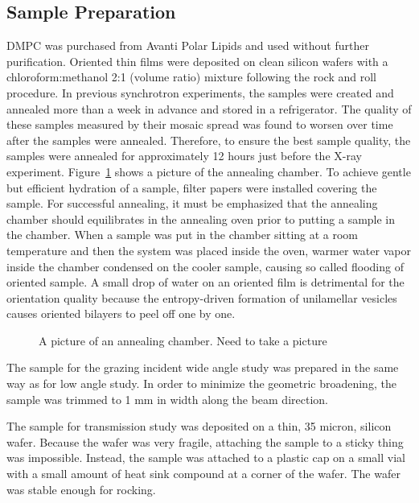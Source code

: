 \subsection{Sample Preparation}
DMPC was purchased from Avanti Polar Lipids and used without further purification.
Oriented thin films were deposited on clean silicon wafers with
a chloroform:methanol 2:1 (volume ratio) mixture following the rock and roll procedure.   
In previous synchrotron experiments, the samples were created and annealed 
more than a week in advance and stored in a refrigerator. The quality of 
these samples measured by their mosaic spread was found to worsen over time
after the samples were annealed. Therefore, to ensure the best sample quality, the 
samples were annealed for approximately 12 hours just before the X-ray experiment.
Figure~\ref{fig:annealing_chamber} shows a picture of the annealing chamber. 
To achieve gentle but efficient hydration of a sample, filter papers were installed 
covering the sample. For successful annealing, it must be emphasized that the annealing 
chamber should equilibrates in the annealing oven prior to putting a sample in the chamber.
When a sample was put in the chamber sitting at a room temperature and
then the system was placed inside the oven, warmer water vapor inside the chamber 
condensed on the cooler sample, causing so called flooding of oriented sample. 
A small drop of water on an oriented film is detrimental for the orientation quality because the
entropy-driven formation of unilamellar vesicles causes oriented bilayers to peel off
one by one. 

\begin{figure}[htbp]
  \centering
  \caption{A picture of an annealing chamber. Need to take a picture}
  \label{fig:annealing_chamber}
\end{figure}

The sample for the grazing incident wide angle study was prepared in the same way 
as for low angle study. In order to minimize the geometric broadening, the 
sample was trimmed to 1 mm in width along the beam direction.

The sample for transmission study was deposited on a thin, 35 micron, silicon
wafer. Because the wafer was very fragile, attaching the sample to a sticky 
thing was impossible. Instead, the sample was attached to a plastic cap on 
a small vial with a small amount of heat sink compound at a corner of the 
wafer. The wafer was stable enough for rocking. 

